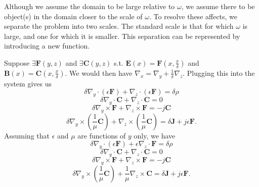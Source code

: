 \documentclass{article}
\theoremstyle{plain}
\begin{document}
Although we assume the domain to be large relative to $\omega$, we assume there to be object(s) in the domain closer to the scale of $\omega$. To resolve these affects, we separate the problem into two scales. The standard scale is that for which $\omega$ is large, and one for which it is smaller. This separation can be represented by introducing a new function.

Suppose $\exists \mathbf{F}(y,z)$ and $\exists \mathbf{C}(y,z)$ s.t. $\mathbf{E}(x) = \mathbf{F}(x,\frac{x}{\delta})$ and $\mathbf{B}(x) = \mathbf{C}(x,\frac{x}{\delta})$. We would then have $\nabla_x = \nabla_y + \frac{1}{\delta}\nabla_z$. Plugging this into the system gives us
\begin{equation}\label{eq:max1b}
	\delta\nabla_y\cdot\left(\epsilon\mathbf{F}\right) + \nabla_z\cdot\left(\epsilon\mathbf{F}\right) = \delta\rho
\end{equation}
\begin{equation}\label{eq:max2b}
	\delta\nabla_y\cdot\mathbf{C} + \nabla_z\cdot\mathbf{C} = 0
\end{equation}
\begin{equation}\label{eq:max3b}
	\delta\nabla_y\times\mathbf{F} + \nabla_z\times\mathbf{F} = -j\mathbf{C}
\end{equation}
\begin{equation}\label{eq:max4b}
	\delta\nabla_y\times\left(\frac{1}{\mu}\mathbf{C}\right) + \nabla_z\times\left(\frac{1}{\mu}\mathbf{C}\right) = \delta\mathbf{J} + j\epsilon\mathbf{F}.
\end{equation}
Assuming that $\epsilon$ and $\mu$ are functions of $y$ only, we have
\begin{equation}\label{eq:max1c}
	\delta\nabla_y\cdot\left(\epsilon\mathbf{F}\right) + \epsilon\nabla_z\cdot\mathbf{F} = \delta\rho
\end{equation}
\begin{equation}\label{eq:max2c}
	\delta\nabla_y\cdot\mathbf{C} + \nabla_z\cdot\mathbf{C} = 0
\end{equation}
\begin{equation}\label{eq:max3c}
	\delta\nabla_y\times\mathbf{F} + \nabla_z\times\mathbf{F} = -j\mathbf{C}
\end{equation}
\begin{equation}\label{eq:max4c}
	\delta\nabla_y\times\left(\frac{1}{\mu}\mathbf{C}\right) + \frac{1}{\mu}\nabla_z\times\mathbf{C} = \delta\mathbf{J} + j\epsilon\mathbf{F}.
\end{equation}
\end{document}
